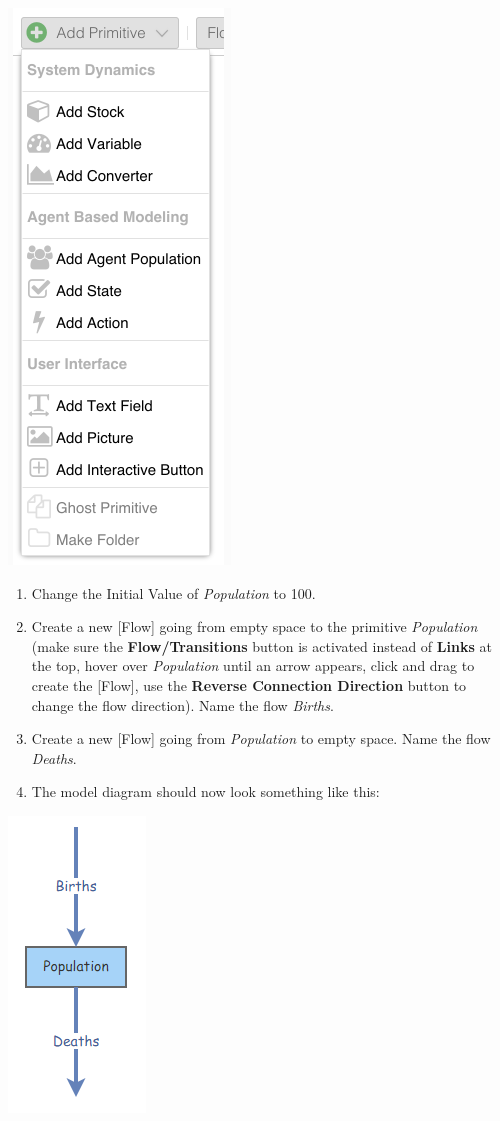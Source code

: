 \documentclass[
]{article}
\begin{document}
\includegraphics{IM1.png}

\begin{enumerate}
\def\labelenumi{\arabic{enumi}.}
\setcounter{enumi}{2}
\item
  Change the Initial Value of \emph{Population} to 100.
\item
  Create a new {[}Flow{]} going from empty space to the primitive
  \emph{Population} (make sure the \textbf{Flow/Transitions} button is
  activated instead of \textbf{Links} at the top, hover over
  \emph{Population} until an arrow appears, click and drag to create the
  {[}Flow{]}, use the \textbf{Reverse Connection Direction} button to
  change the flow direction). Name the flow \emph{Births}.
\item
  Create a new {[}Flow{]} going from \emph{Population} to empty space.
  Name the flow \emph{Deaths}.
\item
  The model diagram should now look something like this:
\end{enumerate}

\includegraphics{IM2.png}
\end{document}
